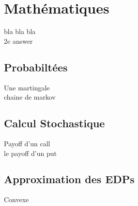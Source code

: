 \documentclass{article}
\begin{document}
\section{Mathématiques}
bla bla bla\\
2e answer

\subsection{Probabiltées}
Une martingale\\
chaine de markov

\subsection{Calcul Stochastique}
Payoff d'un call\\
le payoff d'un put

\subsection{Approximation des EDPs}
Convexe
\end{document}
